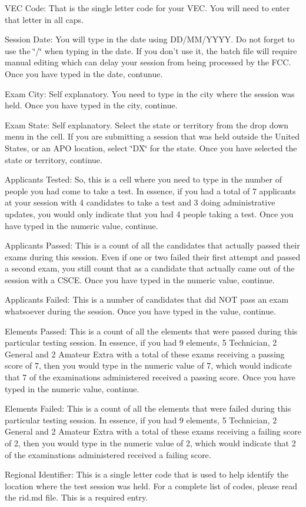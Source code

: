 \begin{DoxyItemize}
\item V\+EC Code\+: That is the single letter code for your V\+EC. You will need to enter that letter in all caps.
\item Session Date\+: You will type in the date using D\+D/\+M\+M/\+Y\+Y\+YY. Do not forget to use the \char`\"{}/\char`\"{} when typing in the date. If you don’t use it, the batch file will require manual editing which can delay your session from being processed by the F\+CC. Once you have typed in the date, contunue.
\item Exam City\+: Self explanatory. You need to type in the city where the session was held. Once you have typed in the city, continue.
\item Exam State\+: Self explanatory. Select the state or territory from the drop down menu in the cell. If you are submitting a session that was held outside the United States, or an A\+PO location, select \char`\"{}\+D\+X\char`\"{} for the state. Once you have selected the state or territory, continue.
\item Applicants Tested\+: So, this is a cell where you need to type in the number of people you had come to take a test. In essence, if you had a total of 7 applicants at your session with 4 candidates to take a test and 3 doing administrative updates, you would only indicate that you had 4 people taking a test. Once you have typed in the numeric value, continue.
\item Applicants Passed\+: This is a count of all the candidates that actually passed their exams during this session. Even if one or two failed their first attempt and passed a second exam, you still count that as a candidate that actually came out of the session with a C\+S\+CE. Once you have typed in the numeric value, continue.
\item Applicants Failed\+: This is a number of candidates that did N\+OT pass an exam whatsoever during the session. Once you have typed in the value, continue.
\item Elements Passed\+: This is a count of all the elements that were passed during this particular testing session. In essence, if you had 9 elements, 5 Technician, 2 General and 2 Amateur Extra with a total of these exams receiving a passing score of 7, then you would type in the numeric value of 7, which would indicate that 7 of the examinations administered received a passing score. Once you have typed in the numeric value, continue.
\item Elements Failed\+: This is a count of all the elements that were failed during this particular testing session. In essence, if you had 9 elements, 5 Technician, 2 General and 2 Amateur Extra with a total of these exams receiving a failing score of 2, then you would type in the numeric value of 2, which would indicate that 2 of the examinations administered received a failing score.
\item Regional Identifier\+: This is a single letter code that is used to help identify the location where the test session was held. For a complete list of codes, please read the {\ttfamily rid.\+md} file. This is a required entry.
\end{DoxyItemize}

